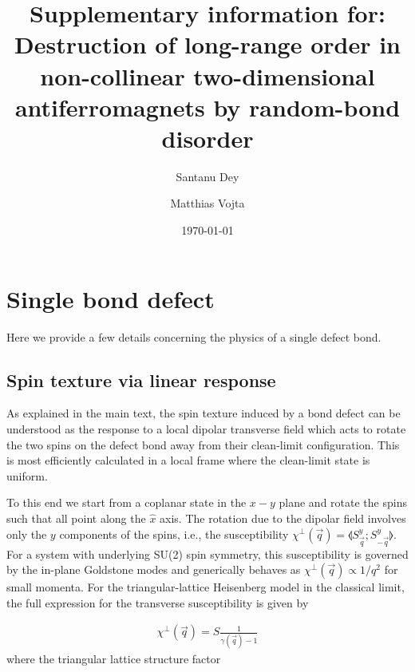 \documentclass[twocolumn,english,aps,prl,floatfix]{revtex4-1}
\begin{document}
\title{Supplementary information for:\\
Destruction of long-range order in non-collinear two-dimensional antiferromagnets by random-bond disorder
}

\author{Santanu Dey}
\author{Matthias Vojta}

\date{\today}

\maketitle

\section{Single bond defect}

Here we provide a few details concerning the physics of a single 
defect bond.

\subsection{Spin texture via linear response}

As explained in the main text, the spin texture induced by a bond 
defect can be understood as the response to a local dipolar 
transverse field which acts to rotate the two spins on the defect 
bond away from their clean-limit configuration. This is most 
efficiently calculated in a local frame where the clean-limit state 
is uniform. 

To this end we start from a coplanar state in the $x-y$ plane and 
rotate the spins such that all point along the $\hat{x}$ axis. The 
rotation due to the dipolar field involves only the $y$ components 
of the  spins, i.e., the susceptibility 
$\chi^\perp(\vec{q}) = \llangle S_{\vec{q}}^y; S^y_{-\vec{q}} \rrangle$. 
For a system with underlying SU(2) spin symmetry, this susceptibility
is governed by the in-plane Goldstone modes and generically behaves 
as $\chi^\perp(\vec{q})\propto 1/q^2$ for small momenta. For the 
triangular-lattice Heisenberg model in the classical limit, the 
full expression for the transverse susceptibility is given by
\cite{wollny-thesis16}

\begin{align}
    \chi^\perp(\vec{q}) = S\frac{1}{\gamma(\vec{q})-1}
\end{align}
where the triangular lattice structure factor 
\end{document}
